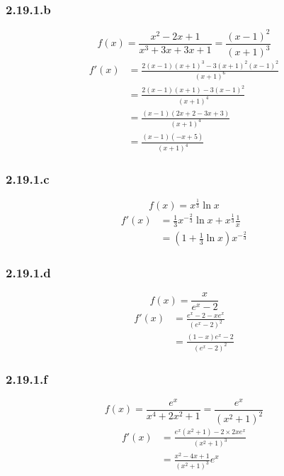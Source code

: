 \documentclass[a4paper,10pt]{report}
\begin{document}
\subsubsection*{2.19.1.b}
\begin{displaymath}
	f(x) = \frac{x^2-2x+1}{x^3+3x+3x+1} = \frac{(x-1)^2}{(x+1)^3}
\end{displaymath}
\begin{equation*}
	\begin{split}
		f'(x) &=\frac{2(x-1)(x+1)^3 - 3(x+1)^2(x-1)^2}{(x+1)^6}\\
		      &=\frac{2(x-1)(x+1) - 3(x-1)^2}{(x+1)^4} \\
		      &=\frac{(x-1)(2x+2-3x+3)}{(x+1)^4} \\
		      &=\frac{(x-1)(-x+5)}{(x+1)^4}
	\end{split}	
\end{equation*}

\subsubsection*{2.19.1.c}
\begin{displaymath}
	f(x) = x^{\frac{1}{3}} \ln x
\end{displaymath}
\begin{equation*}
	\begin{split}
		f'(x) &= \frac{1}{3} x^{-\frac{2}{3}} \ln x + x^{\frac{1}{3}} \frac{1}{x} \\
		      &=\left(1 + \frac{1}{3}\ln x \right) x^{-\frac{2}{3}}
	\end{split}	
\end{equation*}

\subsubsection*{2.19.1.d}
\begin{displaymath}
	f(x) = \frac{x}{e^x-2}
\end{displaymath}
\begin{equation*}
	\begin{split}
		f'(x) &= \frac{e^x-2 - xe^x}{(e^x-2)^2} \\
		      &= \frac{(1-x)e^x-2}{(e^x-2)^2} 
	\end{split}	
\end{equation*}

\subsubsection*{2.19.1.f}
\begin{displaymath}
	f(x) = \frac{e^x}{x^4 + 2x^2 +1} =\frac{e^x}{(x^2 +1)^2}
\end{displaymath}
\begin{equation*}
	\begin{split}
		f'(x) &= \frac{e^x(x^2+1)-2 \times 2xe^x}{(x^2 +1)^3} \\
		      &= \frac{x^2 - 4x + 1}{(x^2 +1)^3}e^x
	\end{split}	
\end{equation*}
\end{document}
